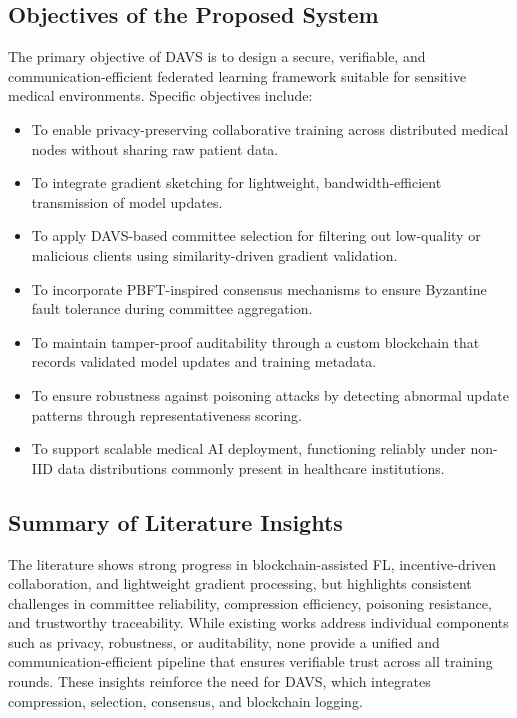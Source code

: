 \documentclass[12pt,a4paper]{article}
\begin{document}
\subsection{Objectives of the Proposed System}
The primary objective of DAVS is to design a secure, verifiable, and communication-efficient federated learning framework suitable for sensitive medical environments.
Specific objectives include:
\begin{itemize}
    \item To enable privacy-preserving collaborative training across distributed medical nodes without sharing raw patient data.
    \item To integrate gradient sketching for lightweight, bandwidth-efficient transmission of model updates.
    \item To apply DAVS-based committee selection for filtering out low-quality or malicious clients using similarity-driven gradient validation.
    \item To incorporate PBFT-inspired consensus mechanisms to ensure Byzantine fault tolerance during committee aggregation.
    \item To maintain tamper-proof auditability through a custom blockchain that records validated model updates and training metadata.
    \item To ensure robustness against poisoning attacks by detecting abnormal update patterns through representativeness scoring.
    \item To support scalable medical AI deployment, functioning reliably under non-IID data distributions commonly present in healthcare institutions.
\end{itemize}

\subsection{Summary of Literature Insights}
The literature shows strong progress in blockchain-assisted FL, incentive-driven collaboration, and lightweight gradient processing, but highlights consistent challenges in committee reliability, compression efficiency, poisoning resistance, and trustworthy traceability. While existing works address individual components such as privacy, robustness, or auditability, none provide a unified and communication-efficient pipeline that ensures verifiable trust across all training rounds. These insights reinforce the need for DAVS, which integrates compression, selection, consensus, and blockchain logging.
\end{document}

